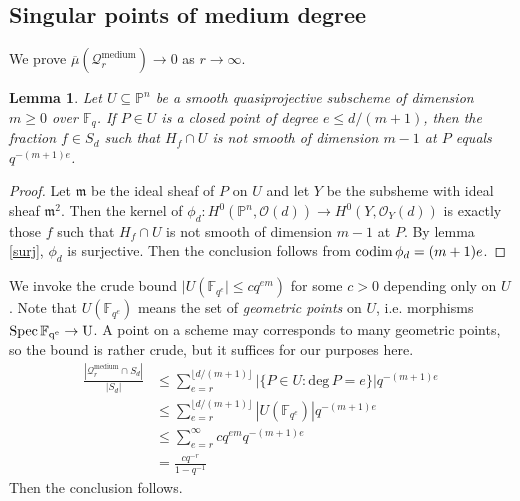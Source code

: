 \documentclass[12pt]{article}
\theoremstyle{plain}
\newtheorem{lemma}[equation]{Lemma}
\theoremstyle{definition}
\newcommand{\fm}{\mathfrak{m}}
\newcommand{\IF}{\mathbb{F}}
\newcommand{\IP}{\mathbb{P}}
\newcommand{\sO}{\mathcal{O}}
\renewcommand{\deg}{\mathrm{deg}\,}
\newcommand{\Spec}{\rm Spec\,}
\newcommand{\codim}{{\rm codim\,}}
\newcommand{\<}{\langle}
\renewcommand{\>}{\rangle}
\newcommand{\Qmed}{\mathcal{Q}_r^\mathrm{medium}}
\newcommand{\uppermu}{\overline{\mu}}
\begin{document}
\subsection{Singular points of medium degree}
We prove $\uppermu(\Qmed) \to 0$ as $r \to \infty$. 
\begin{lemma}
\label{medium}
Let $U \subseteq \IP^n$ be a smooth quasiprojective subscheme of dimension $m \ge 0$ over $\IF_q$. If $P \in U$ is a closed point of degree $e \le d/(m+1)$, then the fraction $f \in S_d$ such that $H_f \cap U$ is not smooth of dimension $m - 1$ at $P$ equals $q^{-(m+1)e}$. 
\end{lemma}
\begin{proof}
Let $\fm$ be the ideal sheaf of $P$ on $U$ and let $Y$ be the subsheme with ideal sheaf $\fm^2$. Then the kernel of $\phi_d : H^0(\IP^n, \sO(d)) \to H^0(Y, \sO_Y(d))$ is exactly those $f$ such that $H_f \cap U$ is not smooth of dimension $m - 1$ at $P$. By lemma \ref{surj}, $\phi_d$ is surjective. Then the conclusion follows from $\codim \phi_d = (m+1)e$. 
\end{proof}
We invoke the crude bound $|U(\IF_{q^e}| \le cq^{em})$ for some $c > 0$ depending only on $U$. Note that $U(\IF_{q^e})$ means the  set of \textit{geometric points} on $U$, i.e. morphisms $\Spec \IF_{q^e} \to U$. A point on a scheme may corresponds to many geometric points, so the bound is rather crude, but it suffices for our purposes here. 
\begin{align*}
\frac{|\Qmed \cap S_d|}{|S_d|}& \le \sum_{e = r}^{\lfloor d /(m+1) \rfloor} |\{P \in U : \deg P = e\}| q^{-(m+1)e} \\
&\le \sum_{e = r}^{\lfloor d /(m+1) \rfloor} |U(\IF_{q^e})| q^{-(m+1)e} \\
&\le  \sum_{e = r}^{\infty} cq^{em}q^{-(m+1)e}\\
&= \frac{cq^{-r}}{1 - q^{-1}}
\end{align*}
Then the conclusion follows. 
\end{document}
